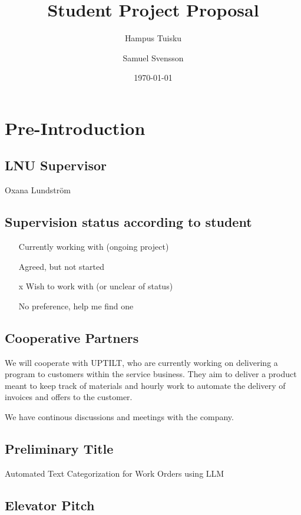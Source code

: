 \documentclass{article}
\title{Student Project Proposal}
\author{Hampus Tuisku \and Samuel Svensson}
\date{\today}
\begin{document}
\maketitle

\section{Pre-Introduction}

\subsection{LNU Supervisor}
Oxana Lundström

\subsection{Supervision status according to student}

\begin{itemize}
      \item [ ] Currently working with (ongoing project)
      \item [ ] Agreed, but not started
      \item [x] Wish to work with (or unclear of status)
      \item [ ] No preference, help me find one
\end{itemize}

\subsection{Cooperative Partners}

We will cooperate with UPTILT, who are currently working on delivering a program
to customers within the service business.
They aim to deliver a product meant to keep track of materials and hourly work
to automate the delivery of invoices and offers to the customer.

We have continous discussions and meetings with the company.

\subsection{Preliminary Title}

Automated Text Categorization for Work Orders using LLM

\subsection{Elevator Pitch}
\end{document}
